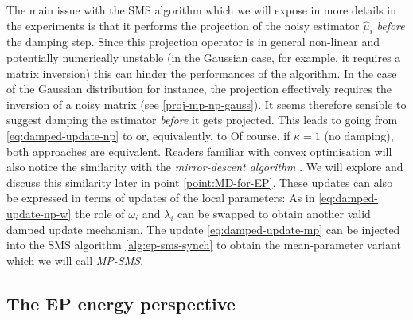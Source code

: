 The main issue with the SMS algorithm which we will expose in more details in the experiments is that it performs the projection of the noisy estimator $\hat\mu_{i}$ \emph{before} the damping step. Since this projection operator is in general non-linear and potentially numerically unstable (in the Gaussian case, for example, it requires a matrix inversion) this can hinder the performances of the algorithm. In the case of the Gaussian distribution for instance, the projection effectively requires the inversion of a noisy matrix (see \eqref{proj-mp-np-gauss}). It seems therefore sensible to suggest damping the estimator \emph{before} it gets projected. This leads to going from \eqref{eq:damped-update-np} to
%
%
or, equivalently, to
%
%
Of course, if $\kappa=1$ (no damping), both approaches are equivalent. Readers familiar with convex optimisation will also notice the similarity with the \emph{mirror-descent algorithm} \citep{nemirovski83, beck03}. We will explore and discuss this similarity later in point \ref{point:MD-for-EP}. 
These updates can also be expressed in terms of updates of the local parameters:
%
%
As in \eqref{eq:damped-update-np-w} the role of $\omega_{i}$ and $\lambda_{i}$ can be swapped to obtain another valid damped update mechanism. 
The update \eqref{eq:damped-update-mp} can be injected into the SMS algorithm \ref{alg:ep-sms-synch} to obtain the mean-parameter variant which we will call \emph{MP-SMS}.

 

\subsection{The EP energy perspective}


